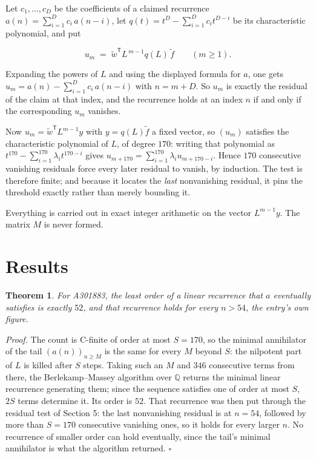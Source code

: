 \documentclass[11pt]{article}
\newtheorem{theorem}{Theorem}
\theoremstyle{definition}
\begin{document}
Let $c_1,\dots,c_D$ be the coefficients of a claimed recurrence $a(n) = \sum_{i=1}^{D} c_i\,a(n-i)$, let $q(t) = t^{D} - \sum_{i=1}^{D} c_i t^{D-i}$ be its characteristic polynomial, and put

\[u_m \;=\; \tilde w^{\mathsf T} L^{\,m-1} q(L)\,\tilde f \qquad (m \ge 1).\]

Expanding the powers of $L$ and using the displayed formula for $a$, one gets $u_m = a(n) - \sum_{i=1}^{D} c_i\,a(n-i)$ with $n = m + D$. So $u_m$ is exactly the residual of the claim at that index, and the recurrence holds at an index $n$ if and only if the corresponding $u_m$ vanishes.

Now $u_m = \tilde w^{\mathsf T} L^{m-1} y$ with $y = q(L)\tilde f$ a fixed vector, so $(u_m)$ satisfies the characteristic polynomial of $L$, of degree $170$: writing that polynomial as $t^{170} - \sum_{i=1}^{170} \lambda_i t^{170-i}$ gives $u_{m+170} = \sum_{i=1}^{170} \lambda_i u_{m+170-i}$. Hence $170$ consecutive vanishing residuals force every later residual to vanish, by induction. The test is therefore finite; and because it locates the {\itshape last} nonvanishing residual, it pins the threshold exactly rather than merely bounding it.

Everything is carried out in exact integer arithmetic on the vector $L^{m-1}y$. The matrix $M$ is never formed.

\section{Results}

\begin{theorem} For A301883, the least order of a linear recurrence that $a$ eventually satisfies is exactly $52$, and that recurrence holds for every $n > 54$, the entry's own figure.\end{theorem}

{\itshape Proof.} The count is C-finite of order at most $S = 170$, so the minimal annihilator of the tail $(a(n))_{n \ge M}$ is the same for every $M$ beyond $S$: the nilpotent part of $L$ is killed after $S$ steps. Taking such an $M$ and $346$ consecutive terms from there, the Berlekamp--Massey algorithm over $\mathbb{Q}$ returns the minimal linear recurrence generating them; since the sequence satisfies one of order at most $S$, $2S$ terms determine it. Its order is $52$. That recurrence was then put through the residual test of Section 5: the last nonvanishing residual is at $n = 54$, followed by more than $S = 170$ consecutive vanishing ones, so it holds for every larger $n$. No recurrence of smaller order can hold eventually, since the tail's minimal annihilator is what the algorithm returned. $\square$
\end{document}
